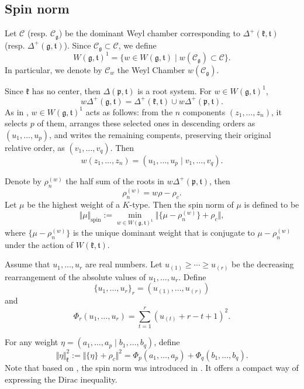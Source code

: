 \documentclass[11pt]{amsart}
\theoremstyle{plain}
\theoremstyle{definition}
\newcommand{\frg}{\mathfrak{g}}
\newcommand{\frk}{\mathfrak{k}}
\newcommand{\frp}{\mathfrak{p}}
\newcommand{\frt}{\mathfrak{t}}
\newcommand{\caC}{\mathcal{C}}
\begin{document}
\subsection{Spin norm}\label{sec-spin-norm}
Let $\caC$ (resp. $\caC_\frg$) be the dominant Weyl chamber corresponding to $\Delta^+(\frk,\frt)$ (resp. $\Delta^+(\frg,\frt)$). Since $\caC_\frg\subset \caC$, we define
\[W(\frg,\frt)^1=\{w\in W(\frg,\frt)\mid w(\caC_\frg)\subset \caC\}.\]
In particular, we denote by $\caC_w$ the Weyl Chamber $w(\caC_\frg)$.

Since $\frk$ has no center, then $\Delta(\frp,\frt)$ is a root system. For $w\in W(\frg,\frt)^1$,
\[w\Delta^+(\frg,\frt)=\Delta^+(\frk,\frt)\cup w\Delta^+(\frp,\frt).\]
As in \cite{DY}, $w\in W(\frg,\frt)^1$ acts as follows: from the $n$ components $(z_1,\dots,z_n)$, it selects $p$ of them, arranges these selected ones in descending orders as $(u_1,\dots,u_p)$, and writes the remaining compents, preserving their original relative order, as $(v_1,\dots,v_q)$. Then
\begin{equation}\label{wgt1}
	w(z_1,\dots,z_n)=(u_1,\dots,u_p\mid v_1,\dots,v_q).
\end{equation}

 Denote by $\rho_n^{(w)}$ the half sum of the roots in $w\Delta^+(\frp,\frt)$, then
 \[\rho_n^{(w)}=w\rho-\rho_c.\]
  Let $\mu$ be the highest weight of a $K$-type. Then the spin norm of $\mu$ is defined to be
 \begin{equation}\label{spin}
 	\Vert\mu\Vert_{\mathrm{spin}}:=\min_{w\in W(\frg,\frt)^1}\Vert \{\mu-\rho_n^{(w)}\}+\rho_c\Vert,
 \end{equation}
 where $\{\mu-\rho_n^{(w)}\}$ is the unique dominant weight that is conjugate to $\mu-\rho_n^{(w)}$ under the action of $W(\frk,\frt)$.


 Assume that $u_1, \dots, u_r$ are real numbers. Let $u_{(1)}\ge\cdots\ge u_{(r)}$ be the decreasing rearrangement of the absolute values of  $u_1, \dots, u_r$. Define
  $$\{u_1, \dots, u_r\}_r=(u_{(1)}, \dots, u_{(r)})$$
  and
 \begin{equation}\label{Phi}
 	\Phi_r(u_1,\dots,u_r)=\sum_{t=1}^r(u_{(t)}+r-t+1)^2.
 \end{equation}

 For any weight $\eta=(a_1, \dots, a_p\mid b_1, \dots, b_q)$, define
 \begin{equation}\label{k-norm}
 \Vert\eta\Vert_\frk^2:=\Vert\{\eta\}+\rho_c\Vert^2=\Phi_p(a_1, \dots, a_p)+\Phi_q(b_1, \dots, b_q).
 \end{equation}
Note that based on \cite{HP}, the spin norm was introduced in \cite{D13}. It offers a compact way of expressing the Dirac inequality.
\end{document}
